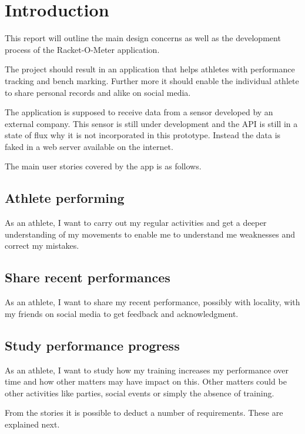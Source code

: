 \chapter{Introduction}
This report will outline the main design concerns as well as the development process of the Racket-O-Meter application.

The project should result in an application that helps athletes with performance tracking and bench marking. Further more it should enable the individual athlete to share personal records and alike on social media.

The application is supposed to receive data from a sensor developed by an external company. This sensor is still under development and the API is still in a state of flux why it is not incorporated in this prototype. Instead the data is faked in a web server available on the internet.

The main user stories covered by the app is as follows.

\section*{Athlete performing}
As an athlete, I want to carry out my regular activities and get a deeper understanding of my movements to enable me to understand me weaknesses and correct my mistakes.

\section*{Share recent performances}
As an athlete, I want to share my recent performance, possibly with locality, with my friends on social media to get feedback and acknowledgment.

\section*{Study performance progress}
As an athlete, I want to study how my training increases my performance over time and how other matters may have impact on this.
Other matters could be other activities like parties, social events or simply the absence of training.

From the stories it is possible to deduct a number of requirements. These are explained next.
